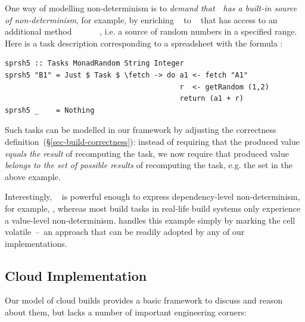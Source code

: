 One way of modelling non-determinism is to \emph{demand that}~~\emph{has a
built-in source of non-determinism}, for example, by enriching
~ to ~ that has access to an
additional method
~\hs{::}~~~\hs{->}~~,
i.e. a source of random numbers in a specified range. Here is a task description
corresponding to a spreadsheet with the formula :

\begin{verbatim}
sprsh5 :: Tasks MonadRandom String Integer
sprsh5 "B1" = Just $ Task $ \fetch -> do a1 <- fetch "A1"
                                         r  <- getRandom (1,2)
                                         return (a1 + r)
sprsh5 _    = Nothing
\end{verbatim}
\vspace{1mm}

\noindent
Such tasks can be modelled in our framework by adjusting the correctness
definition~(\S\ref{sec-build-correctness}): instead of requiring that the
produced value \emph{equals the result} of recomputing the task, we now require
that produced value \emph{belongs to the set of possible results} of
recomputing the task, e.g. the set  in the above
example.


Interestingly, ~ is powerful enough to express
dependency-level non-determinism, for example,
, whereas most build tasks in real-life
build systems only experience a value-level non-determinism. \mbox{\Excel}
handles this example simply by marking the cell volatile~--~an approach that can
be readily adopted by any of our implementations.

\vspace{-1mm}
\subsection{Cloud Implementation}\label{sec-cloud-aspects}

Our model of cloud builds provides a basic framework to discuss and reason
about them, but lacks a number of important engineering corners:

